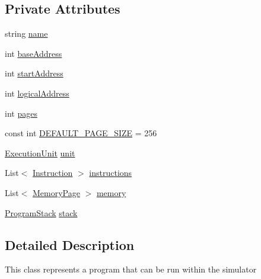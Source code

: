 \subsection*{Private Attributes}
\begin{DoxyCompactItemize}
\item 
string \hyperlink{class_c_p_u___o_s___simulator_1_1_c_p_u_1_1_simulator_program_ad4797b5d81ceb01cd4207a97b7af36c5}{name}
\item 
int \hyperlink{class_c_p_u___o_s___simulator_1_1_c_p_u_1_1_simulator_program_a7cca2ee3950e37d25f4f68d76d1241c4}{base\+Address}
\item 
int \hyperlink{class_c_p_u___o_s___simulator_1_1_c_p_u_1_1_simulator_program_a4c9c4638141ac68fc7f2fed83c53d3f5}{start\+Address}
\item 
int \hyperlink{class_c_p_u___o_s___simulator_1_1_c_p_u_1_1_simulator_program_a4d5ae08fcd223ce00d95588b8761d09c}{logical\+Address}
\item 
int \hyperlink{class_c_p_u___o_s___simulator_1_1_c_p_u_1_1_simulator_program_ad86f4c2caa37cf36b8ab276ebe2a39bb}{pages}
\item 
const int \hyperlink{class_c_p_u___o_s___simulator_1_1_c_p_u_1_1_simulator_program_ad43b4a6e2b20d2097ef7ba885dfa4249}{D\+E\+F\+A\+U\+L\+T\+\_\+\+P\+A\+G\+E\+\_\+\+S\+I\+Z\+E} = 256
\item 
\hyperlink{class_c_p_u___o_s___simulator_1_1_c_p_u_1_1_execution_unit}{Execution\+Unit} \hyperlink{class_c_p_u___o_s___simulator_1_1_c_p_u_1_1_simulator_program_a10e4c29c3ed9b84c0fb8aee7613cabf9}{unit}
\item 
List$<$ \hyperlink{class_c_p_u___o_s___simulator_1_1_c_p_u_1_1_instruction}{Instruction} $>$ \hyperlink{class_c_p_u___o_s___simulator_1_1_c_p_u_1_1_simulator_program_a30b501e0b2d012212077059be49857cf}{instructions}
\item 
List$<$ \hyperlink{class_c_p_u___o_s___simulator_1_1_memory_1_1_memory_page}{Memory\+Page} $>$ \hyperlink{class_c_p_u___o_s___simulator_1_1_c_p_u_1_1_simulator_program_a402e53ae5daf1b6be0d5b7b705091c9c}{memory}
\item 
\hyperlink{class_c_p_u___o_s___simulator_1_1_c_p_u_1_1_program_stack}{Program\+Stack} \hyperlink{class_c_p_u___o_s___simulator_1_1_c_p_u_1_1_simulator_program_a85f44af349486db4b141b3946bf21a64}{stack}
\end{DoxyCompactItemize}


\subsection{Detailed Description}
This class represents a program that can be run within the simulator 



